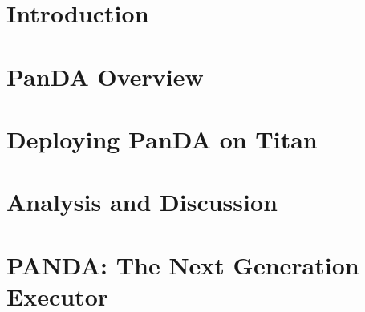 \documentclass[conference]{IEEEtran}
\begin{document}
\begin{abstract}

\end{abstract}


\section{Introduction}\label{sec:intro}



\section{PanDA Overview}\label{sec:panda_overview}



\section{Deploying PanDA on Titan}\label{sec:panda_titan}



\section{Analysis and Discussion}\label{sec:analysis}



\section{PANDA\@: The Next Generation Executor}\label{sec:panda_roadmap}




\end{document}
